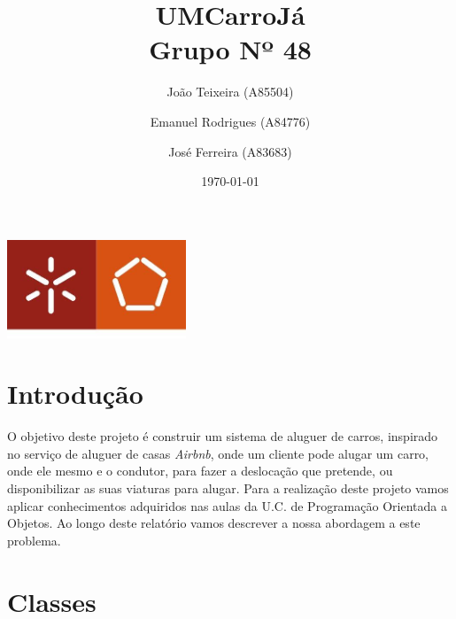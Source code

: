 \documentclass[a4paper]{report}
\begin{document}
\title{UMCarroJá\\ 
\large Grupo Nº 48}
\author{João Teixeira (A85504) \and Emanuel Rodrigues (A84776) \and José Ferreira (A83683)}
\date{\today}

\begin{center}
    \begin{minipage}{0.75\linewidth}
        \centering
        \includegraphics[width=0.4\textwidth]{eng.jpeg}\par\vspace{1cm}
        \vspace{1.5cm}
        \href{https://www.uminho.pt/PT}
        {\color{black}{\scshape\LARGE Universidade do Minho}} \par
        \vspace{1cm}
        {\color{black}{\scshape\Large Programação Orientada a Objetos}} \par
        \vspace{1.5cm}
        \maketitle
    \end{minipage}
\end{center}

\tableofcontents

\pagebreak

\chapter{Introdução}

O objetivo deste projeto é construir um sistema de aluguer de carros,
inspirado no serviço de aluguer de casas \textit{Airbnb}, onde um cliente
pode alugar um carro, onde ele mesmo e o condutor, para fazer a deslocação
que pretende, ou disponibilizar as suas viaturas para alugar. Para a realização
deste projeto vamos aplicar conhecimentos adquiridos nas aulas da U.C. de 
Programação Orientada a Objetos.
Ao longo deste relatório vamos descrever a nossa abordagem a este problema.

\chapter{Classes}\label{chap:api}
\end{document}
